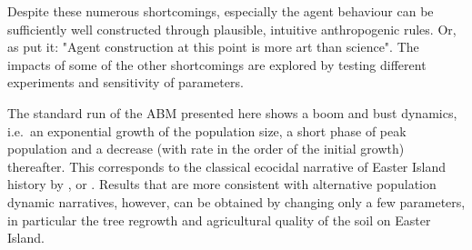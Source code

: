 Despite these numerous shortcomings, especially the agent behaviour can be sufficiently well constructed through plausible, intuitive anthropogenic rules.
Or, as \citet{Kohler2000} put it: "Agent construction at this point is more art than science".
The impacts of some of the other shortcomings are explored by testing different experiments and sensitivity of parameters.

The standard run of the ABM presented here shows a boom and bust dynamics, i.e.\ an exponential growth of the population size, a short phase of peak population and a decrease (with rate in the order of the initial growth) thereafter.
This corresponds to the classical ecocidal narrative of Easter Island history by \citet{Brander1998}, \citet{Diamond2011} or \citet{Bahn2017}.
Results that are more consistent with alternative population dynamic narratives, however, can be obtained by changing only a few parameters, in particular the tree regrowth and agricultural quality of the soil on Easter Island.



